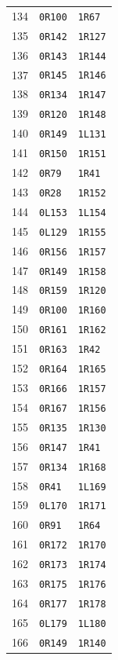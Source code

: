 \begin{longtable}{rll}
134 & \texttt{0R100} & \texttt{1R67}\\
135 & \texttt{0R142} & \texttt{1R127}\\
136 & \texttt{0R143} & \texttt{1R144}\\
137 & \texttt{0R145} & \texttt{1R146}\\
138 & \texttt{0R134} & \texttt{1R147}\\
139 & \texttt{0R120} & \texttt{1R148}\\
140 & \texttt{0R149} & \texttt{1L131}\\
141 & \texttt{0R150} & \texttt{1R151}\\
142 & \texttt{0R79} & \texttt{1R41}\\
143 & \texttt{0R28} & \texttt{1R152}\\
144 & \texttt{0L153} & \texttt{1L154}\\
145 & \texttt{0L129} & \texttt{1R155}\\
146 & \texttt{0R156} & \texttt{1R157}\\
147 & \texttt{0R149} & \texttt{1R158}\\
148 & \texttt{0R159} & \texttt{1R120}\\
149 & \texttt{0R100} & \texttt{1R160}\\
150 & \texttt{0R161} & \texttt{1R162}\\
151 & \texttt{0R163} & \texttt{1R42}\\
152 & \texttt{0R164} & \texttt{1R165}\\
153 & \texttt{0R166} & \texttt{1R157}\\
154 & \texttt{0R167} & \texttt{1R156}\\
155 & \texttt{0R135} & \texttt{1R130}\\
156 & \texttt{0R147} & \texttt{1R41}\\
157 & \texttt{0R134} & \texttt{1R168}\\
158 & \texttt{0R41} & \texttt{1L169}\\
159 & \texttt{0L170} & \texttt{1R171}\\
160 & \texttt{0R91} & \texttt{1R64}\\
161 & \texttt{0R172} & \texttt{1R170}\\
162 & \texttt{0R173} & \texttt{1R174}\\
163 & \texttt{0R175} & \texttt{1R176}\\
164 & \texttt{0R177} & \texttt{1R178}\\
165 & \texttt{0L179} & \texttt{1L180}\\
166 & \texttt{0R149} & \texttt{1R140}\\

\end{longtable}
